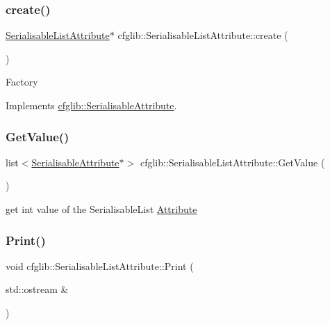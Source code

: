 \subsubsection{\texorpdfstring{create()}{create()}}
{\footnotesize\ttfamily \hyperlink{classcfglib_1_1SerialisableListAttribute}{Serialisable\+List\+Attribute}$\ast$ cfglib\+::\+Serialisable\+List\+Attribute\+::create (\begin{DoxyParamCaption}{ }\end{DoxyParamCaption})\hspace{0.3cm}{\ttfamily [virtual]}}

Factory 

Implements \hyperlink{classcfglib_1_1SerialisableAttribute_a43e0793a2302b933997b9b3f5156ffff}{cfglib\+::\+Serialisable\+Attribute}.

\mbox{\label{classcfglib_1_1SerialisableListAttribute_af8534bcf974bc68717fe369059b45146}} 
\subsubsection{\texorpdfstring{Get\+Value()}{GetValue()}}
{\footnotesize\ttfamily list$<$\hyperlink{classcfglib_1_1SerialisableAttribute}{Serialisable\+Attribute}$\ast$$>$ cfglib\+::\+Serialisable\+List\+Attribute\+::\+Get\+Value (\begin{DoxyParamCaption}{ }\end{DoxyParamCaption})\hspace{0.3cm}{\ttfamily [inline]}}

get int value of the Serialisable\+List \hyperlink{classcfglib_1_1Attribute}{Attribute} \mbox{\label{classcfglib_1_1SerialisableListAttribute_a3a76c800c9ebcd084b64c1c5f049caf5}} 
\subsubsection{\texorpdfstring{Print()}{Print()}}
{\footnotesize\ttfamily void cfglib\+::\+Serialisable\+List\+Attribute\+::\+Print (\begin{DoxyParamCaption}\item[{std\+::ostream \&}]{ }\end{DoxyParamCaption})\hspace{0.3cm}{\ttfamily [virtual]}}

